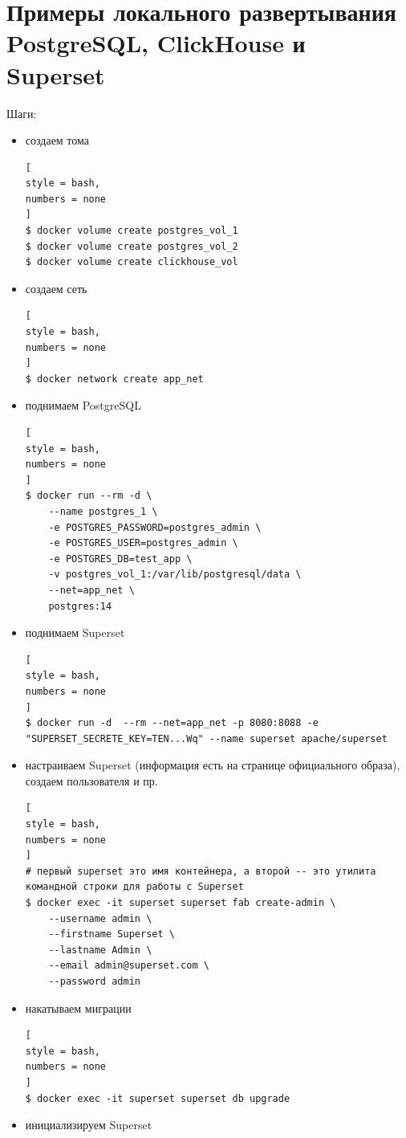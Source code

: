 \documentclass[%
	11pt,
	a4paper,
	utf8,
		]{article}
\begin{document}
\section{Примеры локального развертывания PostgreSQL, ClickHouse и  Superset}

Шаги:
\begin{itemize}
	\item создаем тома
\begin{lstlisting}[
style = bash,
numbers = none
]
$ docker volume create postgres_vol_1
$ docker volume create postgres_vol_2
$ docker volume create clickhouse_vol
\end{lstlisting}
    \item создаем сеть
\begin{lstlisting}[
style = bash,
numbers = none
]
$ docker network create app_net
\end{lstlisting}
    \item поднимаем PostgreSQL
\begin{lstlisting}[
style = bash,
numbers = none
]
$ docker run --rm -d \
    --name postgres_1 \
    -e POSTGRES_PASSWORD=postgres_admin \
    -e POSTGRES_USER=postgres_admin \
    -e POSTGRES_DB=test_app \
    -v postgres_vol_1:/var/lib/postgresql/data \
    --net=app_net \
    postgres:14
\end{lstlisting}
    \item поднимаем Superset
\begin{lstlisting}[
style = bash,
numbers = none
]
$ docker run -d  --rm --net=app_net -p 8080:8088 -e "SUPERSET_SECRETE_KEY=TEN...Wq" --name superset apache/superset
\end{lstlisting}
    \item настраиваем Superset (информация есть на странице официального образа), создаем пользователя и пр.
\begin{lstlisting}[
style = bash,
numbers = none
]
# первый superset это имя контейнера, а второй -- это утилита командной строки для работы с Superset
$ docker exec -it superset superset fab create-admin \
    --username admin \
    --firstname Superset \
    --lastname Admin \
    --email admin@superset.com \
    --password admin
\end{lstlisting}
    \item накатываем миграции
\begin{lstlisting}[
style = bash,
numbers = none
]
$ docker exec -it superset superset db upgrade
\end{lstlisting}
    \item инициализируем Superset

\end{itemize}
\end{document}
